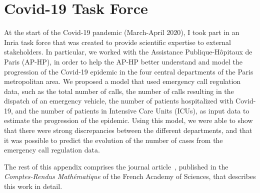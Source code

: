 \chapter{Covid-19 Task Force}
\label{chap:covid}

At the start of the Covid-19 pandemic (March-April 2020), I took part in an Inria task force that was created to provide scientific expertise to external stakeholders.
In particular, we worked with the Assistance Publique-Hôpitaux de Paris (AP-HP), in order to help the AP-HP better understand and model the progression of the Covid-19 epidemic in the four central departments of the Paris metropolitan area.
We proposed a model that used emergency call regulation data, such as the total number of calls, the number of calls resulting in the dispatch of an emergency vehicle, the number of patients hospitalized with Covid-19, and the number of patients in Intensive Care Units (ICUs), as input data to estimate the progression of the epidemic.
Using this model, we were able to show that there were strong discrepancies between the different departments, and that it was possible to predict the evolution of the number of cases from the emergency call regulation data.

The rest of this appendix comprises the journal article~\citep{gaubert2020}, published in the \emph{Comptes-Rendus Mathématique} of the French Academy of Sciences, that describes this work in detail.


